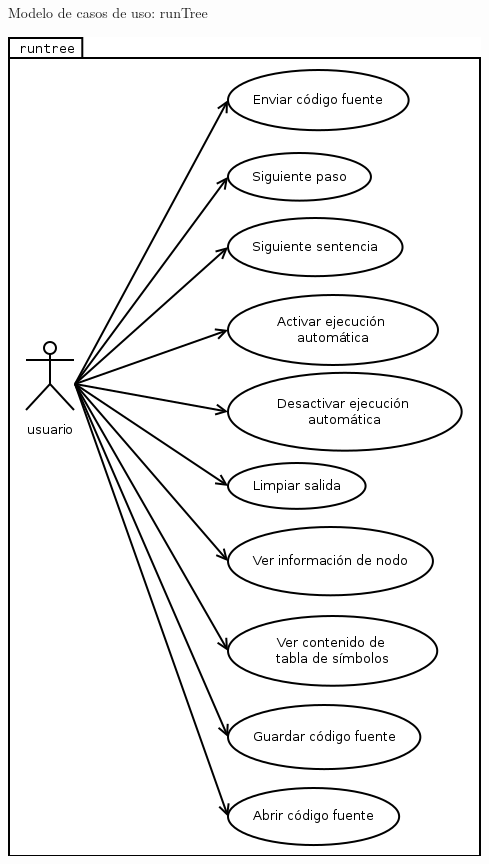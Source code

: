 \documentclass[spanish]{beamer}
\begin{document}
\begin{frame}{Modelo de casos de uso: runTree}
   \begin{center}
      \includegraphics[scale=0.25]{runtree.png}
   \end{center}
\end{frame}
\end{document}
